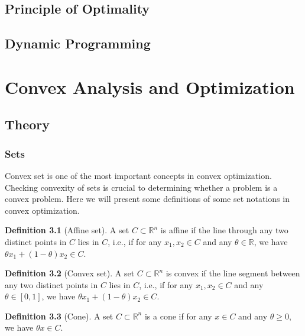 \documentclass[
]{book}
\theoremstyle{definition}
\newtheorem{definition}{Definition}[chapter]
\theoremstyle{definition}
\theoremstyle{definition}
\theoremstyle{definition}
\theoremstyle{remark}
\begin{document}
\section{Principle of Optimality}\label{optimality}

\section{Dynamic Programming}\label{dp}

\appendix


\chapter{Convex Analysis and Optimization}\label{appconvex}

\section{Theory}\label{appconvex-theory}

\subsection{Sets}\label{sets}

Convex set is one of the most important concepts in convex optimization. Checking convexity of sets is crucial to determining whether a problem is a convex problem. Here we will present some definitions of some set notations in convex optimization.

\begin{definition}[Affine set]
\protect\hypertarget{def:affineset}{}\label{def:affineset}A set \(C\subset \mathbb{R}^n\) is affine if the line through any two distinct points in \(C\) lies in \(C\), i.e., if for any \(x_1,x_2 \in C\) and any \(\theta \in \mathbb{R}\), we have \(\theta x_1 + (1-\theta)x_2 \in C\).
\end{definition}

\begin{definition}[Convex set]
\protect\hypertarget{def:convexset}{}\label{def:convexset}A set \(C\subset \mathbb{R}^n\) is convex if the line segment between any two distinct points in \(C\) lies in \(C\), i.e., if for any \(x_1,x_2 \in C\) and any \(\theta \in [0,1]\), we have \(\theta x_1 + (1-\theta)x_2 \in C\).
\end{definition}

\begin{definition}[Cone]
\protect\hypertarget{def:cone}{}\label{def:cone}A set \(C\subset \mathbb{R}^n\) is a cone if for any \(x\in C\) and any \(\theta\geq 0\), we have \(\theta x \in C\).
\end{definition}
\end{document}
